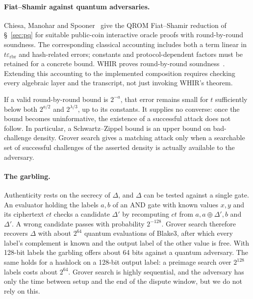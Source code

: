 \documentclass[11pt]{article}
\newcommand{\AND}{\textsf{AND}}
\begin{document}
\paragraph{Fiat--Shamir against quantum adversaries.} Chiesa, Manohar and
Spooner~\cite{cms19qrom} give the QROM Fiat--Shamir reduction of
\S~\ref{sec:pq} for suitable public-coin interactive oracle proofs with
round-by-round soundness. The corresponding classical accounting includes both a term
linear in $t\varepsilon_{\mathrm{rbr}}$ and hash-related errors; constants and
protocol-dependent factors must be retained for a concrete bound.
WHIR proves round-by-round soundness~\cite[\S5]{whir25}. Extending this
accounting to the implemented composition requires checking every algebraic
layer and the transcript, not just invoking WHIR's theorem.

If a valid round-by-round bound is $2^{-a}$, that error remains
small for $t$ sufficiently below both $2^{a/2}$ and $2^{\lambda/3}$, up to its
constants. It supplies no converse: once the bound becomes uninformative,
the existence of a successful attack does not follow. In particular, a
Schwartz--Zippel bound is an upper bound on bad-challenge density. Grover
search gives a matching attack only when a searchable set of successful
challenges of the asserted density is actually available to the adversary.

\paragraph{The garbling.} Authenticity rests on the secrecy of $\Delta$, and
$\Delta$ can be tested against a single gate. An evaluator holding the labels
$a,b$ of an \AND{} gate with known values $x,y$ and its ciphertext $\mathit{ct}$
checks a candidate $\Delta'$ by recomputing $\mathit{ct}$ from
$a,a\oplus\Delta',b$ and $\Delta'$. A wrong candidate passes with probability
$2^{-128}$. Grover search therefore recovers $\Delta$ with about $2^{64}$
quantum evaluations of Blake3, after which every label's complement is known
and the output label of the other value is free. With 128-bit labels the
garbling offers about 64 bits against a quantum adversary. The same holds for a
hashlock on a 128-bit output label: a preimage search over $2^{128}$ labels costs
about $2^{64}$. Grover search is highly sequential, and the adversary has only the
time between setup and the end of the dispute window, but we do not rely on
this.
\end{document}
